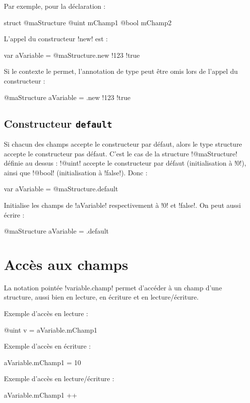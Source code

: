 Par exemple, pour la déclaration :
\begin{galgas}
struct @maStructure
  @uint mChamp1
  @bool mChamp2
\end{galgas}

L'appel du constructeur \ggs!new! est :
\begin{galgas}
var aVariable = @maStructure.new {!123 !true}
\end{galgas}

Si le contexte le permet, l'annotation de type peut être omis lors de l'appel du constructeur :
\begin{galgas}
@maStructure aVariable = .new {!123 !true}
\end{galgas}


\subsection{Constructeur \texttt{default}}

Si chacun des champs accepte le constructeur par défaut, alors le type structure accepte le constructeur pas défaut. C'est le cas de la structure \ggs!@maStructure! définie au dessus : \ggs!@uint! accepte le constructeur par défaut (initialisation à \ggs!0!), ainsi que \ggs!@bool! (initialisation à \ggs!false!). Donc :
\begin{galgas}
var aVariable = @maStructure.default
\end{galgas}
Initialise les champs de \ggs!aVariable! respectivement à \ggs!0! et \ggs!false!. On peut aussi écrire :
\begin{galgas}
@maStructure aVariable = .default
\end{galgas}


\section{Accès aux champs}

La notation pointée \ggs!variable.champ! permet d'accéder à un champ d'une structure, aussi bien en lecture, en écriture et en lecture/écriture.

Exemple d'accès en lecture :
\begin{galgas}
@uint v = aVariable.mChamp1
\end{galgas}

Exemple d'accès en écriture :
\begin{galgas}
aVariable.mChamp1 = 10
\end{galgas}


Exemple d'accès en lecture/écriture :
\begin{galgas}
aVariable.mChamp1 ++
\end{galgas}





